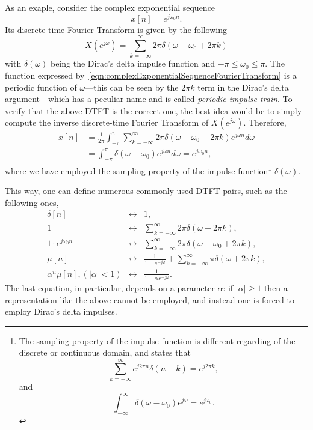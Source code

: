 \documentclass[\documentfontsize, twocolumn]{\classname}
\begin{document}
As an exaple, consider the complex exponential sequence
\begin{equation}\label{eqn:complexExponentialSequence}
    x[n] = e^{j \omega_0 n}.
\end{equation}
Its discrete-time Fourier Transform is given by the following
\begin{equation}\label{eqn:complexExponentialSequenceFourierTransform}
    X(e^{j\omega}) = \sum_{k=-\infty}^\infty 2\pi \delta(\omega - \omega_0 + 2\pi k)
\end{equation}
with $\delta(\omega)$ being the Dirac's delta impulse function and $-\pi \leq \omega_0 \leq \pi$. The function expressed by~\ref{eqn:complexExponentialSequenceFourierTransform} is a periodic function of $\omega$---this can be seen by the $2\pi k$ term in the Dirac's delta argument---which has a peculiar name and is called \emph{periodic impulse train}. To verify that the above DTFT is the correct one, the best idea would be to simply compute the inverse discrete-time Fourier Transform of $X(e^{j\omega})$. Therefore,
\begin{align*}
    x[n] &= \frac 1 {2\pi} \int_{-\pi}^\pi \sum_{k=-\infty}^\infty 2\pi\delta(\omega - \omega_0 + 2\pi k)e^{j\omega n}d\omega\\
         &= \int_{-\pi}^\pi \delta(\omega - \omega_0) e^{j\omega n} d\omega = e^{j\omega_0 n},
\end{align*}
where we have employed the sampling property of the impulse function\footnote{
    The sampling property of the impulse function is different regarding of the discrete or continuous domain, and states that
    \begin{equation}\label{eqn:samplingPropertyDeltaSum}
        \sum_{k=-\infty}^\infty e^{j2\pi n}\delta(n-k) = e^{j 2 \pi k},
    \end{equation}
    and
    \begin{equation}\label{eqn:samplingPropertyDeltaIntegral}
        \int_{-\infty}^\infty \delta(\omega-\omega_0)e^{j\omega} = e^{j\omega_0}.
    \end{equation}
} $\delta(\omega)$.

This way, one can define numerous commonly used DTFT pairs, such as the following ones,
\[
    \begin{array}{rcl}
        \delta[n] & \longleftrightarrow & 1, \\
        1 & \longleftrightarrow & \sum_{k=-\infty}^\infty 2\pi \delta(\omega + 2\pi k), \\
        1\cdot e^{j\omega_0 n} & \longleftrightarrow & \sum_{k=-\infty}^\infty 2\pi \delta(\omega - \omega_0 + 2\pi k), \\
        \mu[n] & \longleftrightarrow & \frac {1}{1 - e^{-j\omega}} + \sum_{k=-\infty}^\infty \pi \delta(\omega + 2\pi k), \\
        \alpha^n \mu[n], (|\alpha| < 1) & \longleftrightarrow & \frac{1}{1 - \alpha e^{-j\omega}}.
    \end{array}
\]
The last equation, in particular, depends on a parameter $\alpha$: if $|\alpha| \geq 1$ then a representation like the above cannot be employed, and instead one is forced to employ Dirac's delta impulses.
\clearpage
\end{document}
